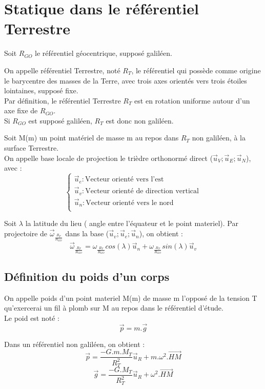 \section{Statique dans le référentiel Terrestre}
Soit $R_{GO}$ le référentiel géocentrique, supposé galiléen.
\begin{de}
On appelle référentiel Terrestre, noté $R_T$, le référentiel qui possède comme origine le barycentre des masses de la Terre, avec trois axes orientés vers trois étoiles lointaines, supposé fixe.\\
Par définition, le référentiel Terrestre $R_T$ est en rotation uniforme autour d'un axe fixe de $R_{GO}$.\\
Si $R_{GO}$ est supposé galiléen, $R_T$ est donc non galiléen.
\end{de}
\begin{de}
 Soit M(m) un point matériel de masse m au repos dans $R_T$ non galiléen, à la surface Terrestre.\\
On appelle base locale de projection le trièdre orthonormé direct  ($\overrightarrow{u}_V;\overrightarrow{u}_E;\overrightarrow{u}_N$), avec : 
$$\left\{\begin{array}{l}
   \overrightarrow{u}_{e} : \mbox{Vecteur orienté vers l'est}\\
   \overrightarrow{u}_{v} : \mbox{Vecteur orienté de direction vertical}\\
   \overrightarrow{u}_{n} : \mbox{Vecteur orienté vers le nord}\\
  \end{array}\right.$$
\end{de}
Soit $\lambda$ la latitude du lieu ( angle entre l'équateur et le point materiel). Par projectoire de $\overrightarrow{\omega}_{\frac{R_T}{R_{GO}}}$ dans la base ($\overrightarrow{u}_v;\overrightarrow{u}_e;\overrightarrow{u}_n$), on obtient : 
$$\overrightarrow{\omega}_{\frac{R_T}{R_{GO}}} = \omega_{\frac{R_T}{R_{GO}}}cos(\lambda)\overrightarrow{u}_n + \omega_{\frac{R_T}{R_{GO}}} sin(\lambda)\overrightarrow{u}_v$$
\subsection{Définition du poids d'un corps}
\begin{de}
 On appelle poids d'un point materiel M(m) de masse m l'opposé de la tension T qu'exercerai un fil à plomb sur M au repos dans le référentiel d'étude.\\
Le poid est noté : 
$$\overrightarrow{p} = m.\overrightarrow{g}$$
\end{de}
Dans un référentiel non galiléen, on obtient : 
$$\overrightarrow{p} = \dfrac{-G.m.M_T}{R_T^2} \overrightarrow{u}_R + m.\omega^2.\overrightarrow{HM}$$
$$\overrightarrow{g} = \dfrac{-G.M_T}{R_T^2} \overrightarrow{u}_R + \omega^2.\overrightarrow{HM}$$
